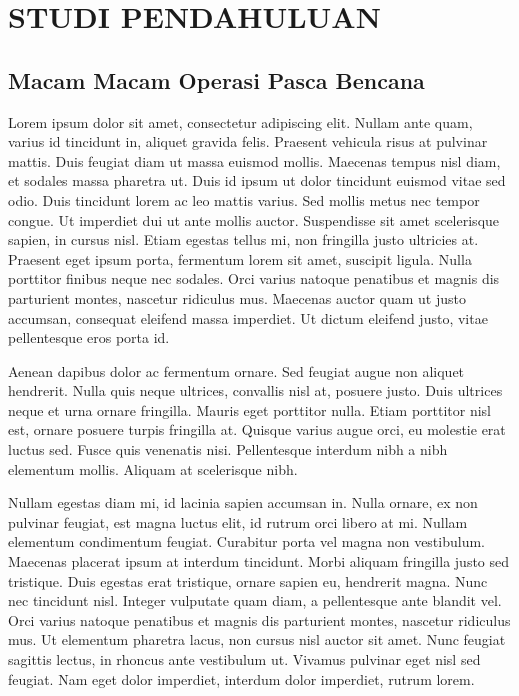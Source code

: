 
\chapter{STUDI PENDAHULUAN}

\ifpdf
    \graphicspath{{Chapter2/Figs/Raster/}{Chapter2/Figs/PDF/}{Chapter2/Figs/}}
\else
    \graphicspath{{Chapter2/Figs/Vector/}{Chapter2/Figs/}}
\fi

\section{Macam Macam Operasi Pasca Bencana}
Lorem ipsum dolor sit amet, consectetur adipiscing elit. Nullam ante quam, varius id tincidunt in, aliquet gravida felis. Praesent vehicula risus at pulvinar mattis. Duis feugiat diam ut massa euismod mollis. Maecenas tempus nisl diam, et sodales massa pharetra ut. Duis id ipsum ut dolor tincidunt euismod vitae sed odio. Duis tincidunt lorem ac leo mattis varius. Sed mollis metus nec tempor congue. Ut imperdiet dui ut ante mollis auctor. Suspendisse sit amet scelerisque sapien, in cursus nisl. Etiam egestas tellus mi, non fringilla justo ultricies at. Praesent eget ipsum porta, fermentum lorem sit amet, suscipit ligula. Nulla porttitor finibus neque nec sodales. Orci varius natoque penatibus et magnis dis parturient montes, nascetur ridiculus mus. Maecenas auctor quam ut justo accumsan, consequat eleifend massa imperdiet. Ut dictum eleifend justo, vitae pellentesque eros porta id.

Aenean dapibus dolor ac fermentum ornare. Sed feugiat augue non aliquet hendrerit. Nulla quis neque ultrices, convallis nisl at, posuere justo. Duis ultrices neque et urna ornare fringilla. Mauris eget porttitor nulla. Etiam porttitor nisl est, ornare posuere turpis fringilla at. Quisque varius augue orci, eu molestie erat luctus sed. Fusce quis venenatis nisi. Pellentesque interdum nibh a nibh elementum mollis. Aliquam at scelerisque nibh.

Nullam egestas diam mi, id lacinia sapien accumsan in. Nulla ornare, ex non pulvinar feugiat, est magna luctus elit, id rutrum orci libero at mi. Nullam elementum condimentum feugiat. Curabitur porta vel magna non vestibulum. Maecenas placerat ipsum at interdum tincidunt. Morbi aliquam fringilla justo sed tristique. Duis egestas erat tristique, ornare sapien eu, hendrerit magna. Nunc nec tincidunt nisl. Integer vulputate quam diam, a pellentesque ante blandit vel. Orci varius natoque penatibus et magnis dis parturient montes, nascetur ridiculus mus. Ut elementum pharetra lacus, non cursus nisl auctor sit amet. Nunc feugiat sagittis lectus, in rhoncus ante vestibulum ut. Vivamus pulvinar eget nisl sed feugiat. Nam eget dolor imperdiet, interdum dolor imperdiet, rutrum lorem.

